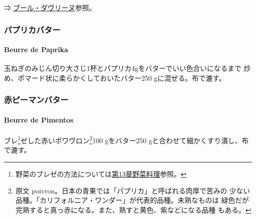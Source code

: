 \begin{recette}
⇒ \protect\hyperlink{beurre-d-aveline}{ブール・ダヴリーヌ}参照。

\maeaki

\hypertarget{ux30d1ux30d7ux30eaux30abux30d0ux30bfux30fc}{%
\subsubsection{パプリカバター}\label{ux30d1ux30d7ux30eaux30abux30d0ux30bfux30fc}}

\hypertarget{beurre-de-paprika}{%
\paragraph{Beurre de Paprika}\label{beurre-de-paprika}}


玉ねぎのみじん切り大さじ1杯とパプリカ4gをバターでいい色合いになるまで
炒め、ポマード状に柔らかくしておいたバター250 gに混ぜる。布で漉す。

\maeaki

\hypertarget{ux8d64ux30d4ux30fcux30deux30f3ux30d0ux30bfux30fc}{%
\subsubsection{赤ピーマンバター}\label{ux8d64ux30d4ux30fcux30deux30f3ux30d0ux30bfux30fc}}

\hypertarget{beurre-de-pimentos}{%
\paragraph{Beurre de Pimentos}\label{beurre-de-pimentos}}


ブレ\footnote{野菜のブレゼの方法については\protect\hyperlink{}{第13章野菜料理}参照。}ゼした赤いポワヴロン\footnote{原文
  poivron。日本の青果では「パプリカ」と呼ばれる肉厚で苦みの
  少ない品種。「カリフォルニア・ワンダー」が代表的品種。未熟なものは
  緑色だが完熟すると真っ赤になる。また、熟すと黄色、紫などになる品種
  もある。}100 gをバター250 gと合わせて細かくすり潰し、布で漉す。


\end{recette}
